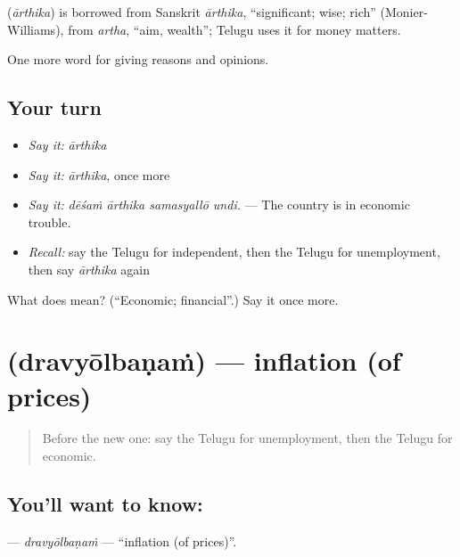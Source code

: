 \begin{cousinweb}
\textbf{} (\emph{ārthika}) is borrowed from Sanskrit \emph{ārthika}, \textquotedblleft{}significant; wise; rich\textquotedblright{} (Monier-Williams), from \emph{artha}, \textquotedblleft{}aim, wealth\textquotedblright{}; Telugu uses it for money matters.
\end{cousinweb}

\begin{grammarlens}[title={What you've built}]
One more word for giving reasons and opinions.
\end{grammarlens}

\subsection*{Your turn}
\begin{itemize}
\raggedright
  \item \emph{Say it:} \emph{ārthika}
  \item \emph{Say it:} \emph{ārthika}, once more
  \item \emph{Say it:} \emph{dēśaṁ ārthika samasyallō undi.} — The country is in economic trouble.
  \item \emph{Recall:} say the Telugu for independent, then the Telugu for unemployment, then say \emph{ārthika} again
\end{itemize}

\begin{tcolorbox}[breakable,colback=teal!4,colframe=teal!35!black,title={Before you move on}]
What does  mean? (\textquotedblleft{}Economic; financial\textquotedblright{}.) Say it once more.
\end{tcolorbox}
\section[\texorpdfstring{\te{ద్రవ్యోల్బణం} (dravyōlbaṇaṁ)}{ద్రవ్యోల్బణం (dravyōlbaṇaṁ)}]{ (dravyōlbaṇaṁ) — inflation (of prices)}

\label{lesson:TE-C405-dravyolbanam}



\begin{quote}
Before the new one: say the Telugu for unemployment, then the Telugu for economic.
\end{quote}

\subsection*{You'll want to know: }
\textbf{} — \emph{dravyōlbaṇaṁ} — \textquotedblleft{}inflation (of prices)\textquotedblright{}.

